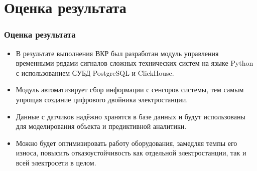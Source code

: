 \documentclass[pdf, hyperref={unicode}, aspectratio=169]{beamer}
\begin{document}
\section{Оценка результата}
\begin{frame}
	\frametitle{Оценка результата}
	
	\begin{itemize}
		\item В результате выполнения ВКР был разработан модуль управления временными рядами сигналов сложных технических систем на языке Python с использованием СУБД PostgreSQL и ClickHouse.
		\item Модуль автоматизирует сбор информации с сенсоров системы, тем самым упрощая создание цифрового двойника электростанции.
		\item Данные с датчиков надёжно хранятся в базе данных и будут использованы для моделирования объекта и предиктивной аналитики.
		\item Можно будет оптимизировать работу оборудования, замедляя темпы его износа, повысить отказоустойчивость как отдельной электростанции, так и всей электросети в целом.
	\end{itemize}
\end{frame}




\end{document}
